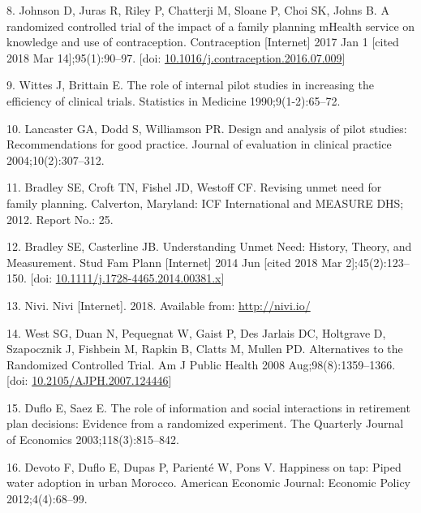 \documentclass[man]{apa6}
\theoremstyle{definition}
\theoremstyle{definition}
\theoremstyle{definition}
\theoremstyle{remark}
\begin{document}
\leavevmode\hypertarget{ref-johnson:2017}{}%
8. Johnson D, Juras R, Riley P, Chatterji M, Sloane P, Choi SK, Johns B.
A randomized controlled trial of the impact of a family planning mHealth
service on knowledge and use of contraception. Contraception
{[}Internet{]} 2017 Jan 1 {[}cited 2018 Mar 14{]};95(1):90--97. {[}doi:
\href{https://doi.org/10.1016/j.contraception.2016.07.009}{10.1016/j.contraception.2016.07.009}{]}

\leavevmode\hypertarget{ref-wittes:1990}{}%
9. Wittes J, Brittain E. The role of internal pilot studies in
increasing the efficiency of clinical trials. Statistics in Medicine
1990;9(1-2):65--72.

\leavevmode\hypertarget{ref-lancaster:2004}{}%
10. Lancaster GA, Dodd S, Williamson PR. Design and analysis of pilot
studies: Recommendations for good practice. Journal of evaluation in
clinical practice 2004;10(2):307--312.

\leavevmode\hypertarget{ref-bradley:2012}{}%
11. Bradley SE, Croft TN, Fishel JD, Westoff CF. Revising unmet need for
family planning. Calverton, Maryland: ICF International and MEASURE DHS;
2012. Report No.: 25.

\leavevmode\hypertarget{ref-bradley:2014}{}%
12. Bradley SE, Casterline JB. Understanding Unmet Need: History,
Theory, and Measurement. Stud Fam Plann {[}Internet{]} 2014 Jun {[}cited
2018 Mar 2{]};45(2):123--150. {[}doi:
\href{https://doi.org/10.1111/j.1728-4465.2014.00381.x}{10.1111/j.1728-4465.2014.00381.x}{]}

\leavevmode\hypertarget{ref-nivi:2018}{}%
13. Nivi. Nivi {[}Internet{]}. 2018. Available from:
\url{http://nivi.io/}

\leavevmode\hypertarget{ref-west:2008}{}%
14. West SG, Duan N, Pequegnat W, Gaist P, Des Jarlais DC, Holtgrave D,
Szapocznik J, Fishbein M, Rapkin B, Clatts M, Mullen PD. Alternatives to
the Randomized Controlled Trial. Am J Public Health 2008
Aug;98(8):1359--1366. {[}doi:
\href{https://doi.org/10.2105/AJPH.2007.124446}{10.2105/AJPH.2007.124446}{]}

\leavevmode\hypertarget{ref-duflo:2003}{}%
15. Duflo E, Saez E. The role of information and social interactions in
retirement plan decisions: Evidence from a randomized experiment. The
Quarterly Journal of Economics 2003;118(3):815--842.

\leavevmode\hypertarget{ref-devoto:2012}{}%
16. Devoto F, Duflo E, Dupas P, Parienté W, Pons V. Happiness on tap:
Piped water adoption in urban Morocco. American Economic Journal:
Economic Policy 2012;4(4):68--99.
\end{document}

